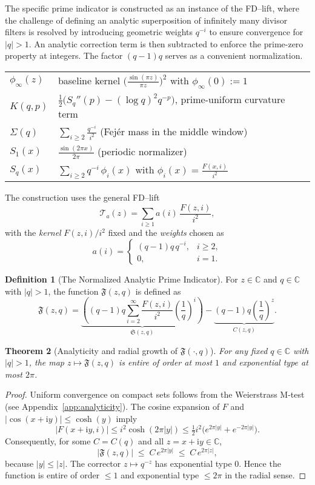 \documentclass[11pt,a4paper]{amsart}
\newcommand{\C}{\mathbb{C}}
\theoremstyle{plain}
\newtheorem{theorem}{Theorem}[section]
\theoremstyle{definition}
\newtheorem{definition}[theorem]{Definition}
\theoremstyle{remark}
\begin{document}
The specific prime indicator is constructed as an instance of the FD--lift, where the challenge of defining an analytic superposition of infinitely many divisor filters is resolved by introducing geometric weights $q^{-i}$ to ensure convergence for $|q|>1$. An analytic correction term is then subtracted to enforce the prime-zero property at integers. The factor $(q-1)q$ serves as a convenient normalization.

\begin{center}
\begin{tabular}{ll}
$\phi_\infty(z)$ & baseline kernel $\bigl(\frac{\sin(\pi z)}{\pi z}\bigr)^2$ with $\phi_\infty(0):=1$ \\[2pt]
$K(q,p)$ & $\tfrac12\big(S_q''(p)-(\log q)^2 q^{-p}\big)$, prime-uniform curvature term \\[2pt]
$\Sigma(q)$ & $\displaystyle \sum_{i\ge2}\frac{q^{-i}}{i^2}$ (Fej\'er mass in the middle window) \\[2pt]
$S_1(x)$ & $\displaystyle \frac{\sin(2\pi x)}{2\pi}$ (periodic normalizer) \\[2pt]
$S_q(x)$ & $\displaystyle \sum_{i\ge2} q^{-i}\,\phi_i(x)$ with $\phi_i(x)=\frac{F(x,i)}{i^2}$
\end{tabular}
\end{center}
\medskip

The construction uses the general FD--lift
\[
\mathcal T_a(z)=\sum_{i\ge1} a(i)\,\frac{F(z,i)}{i^2},
\]
with the \emph{kernel} $F(z,i)/i^2$ fixed and the \emph{weights} chosen as
\[
a(i)=\begin{cases}
(q-1)q\,q^{-i}, & i\ge 2,\\
0, & i=1.
\end{cases}
\]

\begin{definition}[The Normalized Analytic Prime Indicator]
For $z \in \C$ and $q \in \C$ with $|q|>1$, the function $\mathfrak{F}(z,q)$ is defined as
\[\mathfrak{F}(z,q) = \underbrace{\left( (q-1)q \sum_{i=2}^{\infty} \frac{F(z,i)}{i^2} \left(\frac{1}{q}\right)^i \right)}_{\mathfrak{S}(z,q)} - \underbrace{(q-1)q \left(\frac{1}{q}\right)^z}_{C(z,q)}.\]
\end{definition}

\begin{theorem}[Analyticity and radial growth of $\mathfrak{F}(\cdot,q)$]\label{thm:analyticity-growth}
For any fixed $q\in\C$ with $|q|>1$, the map $z \mapsto \mathfrak{F}(z,q)$ is entire of order at most $1$ and exponential type at most $2\pi$.
\end{theorem}
\begin{proof}
Uniform convergence on compact sets follows from the Weierstrass M-test (see Appendix~\ref{app:analyticity}). The cosine expansion of $F$ and $|\cos(x+\mathrm{i}y)|\le\cosh(y)$ imply
\[
|F(x+\mathrm{i}y,i)|\le i^2\cosh(2\pi|y|)\le \tfrac12 i^2\big(e^{2\pi|y|}+e^{-2\pi|y|}\big).
\]
Consequently, for some $C=C(q)$ and all $z=x+\mathrm{i}y\in\C$,
\[
|\mathfrak F(z,q)|\;\le\; C\,e^{2\pi|y|}\;\le\; C\,e^{2\pi|z|},
\]
because $|y|\le |z|$. The corrector $z\mapsto q^{-z}$ has exponential type $0$. Hence the function is entire of order $\le 1$ and exponential type $\le 2\pi$ in the radial sense.
\end{proof}
\end{document}
